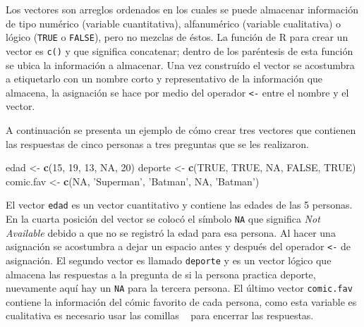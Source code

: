 \documentclass[10pt,]{krantz}
\makeatletter
\newenvironment{Shaded}{\begin{snugshade}}{\end{snugshade}}
\newcommand{\KeywordTok}[1]{\textcolor[rgb]{0.13,0.29,0.53}{\textbf{{#1}}}}
\newcommand{\DecValTok}[1]{\textcolor[rgb]{0.00,0.00,0.81}{{#1}}}
\newcommand{\StringTok}[1]{\textcolor[rgb]{0.31,0.60,0.02}{{#1}}}
\newcommand{\OtherTok}[1]{\textcolor[rgb]{0.56,0.35,0.01}{{#1}}}
\newcommand{\NormalTok}[1]{{#1}}
\let\proglang=\textsf
\newenvironment{kframe}{%
\medskip{}
\setlength{\fboxsep}{.8em}
 \def\at@end@of@kframe{}%
 \ifinner\ifhmode%
  \def\at@end@of@kframe{\end{minipage}}%
  \begin{minipage}{\columnwidth}%
 \fi\fi%
 \def\FrameCommand##1{\hskip\@totalleftmargin \hskip-\fboxsep
 \colorbox{shadecolor}{##1}\hskip-\fboxsep
     \hskip-\linewidth \hskip-\@totalleftmargin \hskip\columnwidth}%
 \MakeFramed {\advance\hsize-\width
   \@totalleftmargin\z@ \linewidth\hsize
   \@setminipage}}%
 {\par\unskip\endMakeFramed%
 \at@end@of@kframe}
\renewenvironment{Shaded}{\begin{kframe}}{\end{kframe}}
\makeatother
\begin{document}
Los vectores  son arreglos ordenados en los cuales se
puede almacenar información de tipo numérico (variable cuantitativa),
alfanumérico (variable cualitativa) o lógico (\texttt{TRUE} o
\texttt{FALSE}), pero no mezclas de éstos. La función de \proglang{R}
para crear un vector es \texttt{c()} y que significa concatenar; dentro
de los paréntesis de esta función se ubica la información a almacenar.
Una vez construído el vector se acostumbra a etiquetarlo con un nombre
corto y representativo de la información que almacena, la asignación se
hace por medio del operador \texttt{\textless{}-} entre el nombre y el
vector.

A continuación se presenta un ejemplo de cómo crear tres vectores que
contienen las respuestas de cinco personas a tres preguntas que se les
realizaron.

\begin{Shaded}
\begin{Highlighting}[]
\NormalTok{edad <-}\StringTok{ }\KeywordTok{c}\NormalTok{(}\DecValTok{15}\NormalTok{, }\DecValTok{19}\NormalTok{, }\DecValTok{13}\NormalTok{, }\OtherTok{NA}\NormalTok{, }\DecValTok{20}\NormalTok{)}
\NormalTok{deporte <-}\StringTok{ }\KeywordTok{c}\NormalTok{(}\OtherTok{TRUE}\NormalTok{, }\OtherTok{TRUE}\NormalTok{, }\OtherTok{NA}\NormalTok{, }\OtherTok{FALSE}\NormalTok{, }\OtherTok{TRUE}\NormalTok{)}
\NormalTok{comic.fav <-}\StringTok{ }\KeywordTok{c}\NormalTok{(}\OtherTok{NA}\NormalTok{, }\StringTok{'Superman'}\NormalTok{, }\StringTok{'Batman'}\NormalTok{, }\OtherTok{NA}\NormalTok{, }\StringTok{'Batman'}\NormalTok{)}
\end{Highlighting}
\end{Shaded}

El vector \texttt{edad} es un vector cuantitativo y contiene las edades
de las 5 personas. En la cuarta posición del vector se colocó el símbolo
\texttt{NA} que significa \textit{Not Available} debido a que no se
registró la edad para esa persona. Al hacer una asignación se acostumbra
a dejar un espacio antes y después del operador \texttt{\textless{}-} de
asignación. El segundo vector es llamado \texttt{deporte} y es un vector
lógico que almacena las respuestas a la pregunta de si la persona
practica deporte, nuevamente aquí hay un \texttt{NA} para la tercera
persona. El último vector \texttt{comic.fav} contiene la información del
cómic favorito de cada persona, como esta variable es cualitativa es
necesario usar las comillas
\texttt{\textquotesingle{}\ \textquotesingle{}} para encerrar las
respuestas.
\end{document}
